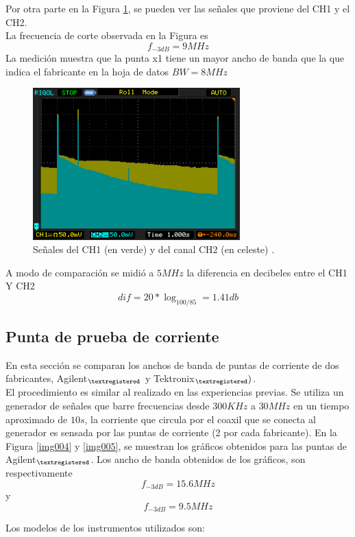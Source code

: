 \documentclass[a4paper,10pt]{article}
\begin{document}
		\indent Por otra parte en la Figura \ref{img002}, se pueden ver las 
		se\~nales que proviene del CH1 y el CH2. \\
		\indent La frecuencia de corte observada en la Figura es 
		$$f_{-3dB}=9MHz$$
		\indent La medición muestra que la punta x1 tiene un mayor ancho de 
		banda que la que indica el fabricante en la hoja de datos
		$BW = 8 MHz$
		\begin{figure}[!htb]
			\centering
			\includegraphics[width=8cm]
			{Imagenes/Mediciones instrumentos/NewFile3.png}
			\caption{Se\~nales del CH1 (en verde) y del canal CH2 (en celeste)
			.} \label{img002}
		\end{figure}						
	
		\indent A modo de comparación se midió a $5 MHz$ la diferencia en 
		decibeles entre el CH1 Y CH2 $$dif = 20*\log_{100/85}  = 1.41db $$

		\subsection{Punta de prueba de corriente}
		\indent En esta secci\'on se comparan los anchos de banda de puntas de
		corriente de dos fabricantes, Agilent$_{\textregistered}$  y 
		Tektronix$_{\textregistered} )$. \\
		\indent El procedimiento es similar al realizado en las experiencias 
		previas. Se utiliza un generador de se\~nales que barre frecuencias 
		desde $300KHz$ a $30MHz$ en un tiempo aproximado de $10s$, la 
		corriente que circula por el coaxil que se conecta al generador es 
		sensada por las puntas de corriente (2 por cada fabricante). En la 
		Figura \ref{img004} y \ref{img005}, se muestran los gr\'aficos 
		obtenidos para las puntas de Agilent$_{\textregistered}$. Los ancho de
		banda obtenidos de los gr\'aficos, son respectivamente 
		$$f_{-3dB}=15.6MHz$$ y $$f_{-3dB}=9.5MHz$$
	
		\indent Los modelos de los instrumentos utilizados son:
		
\end{document}
